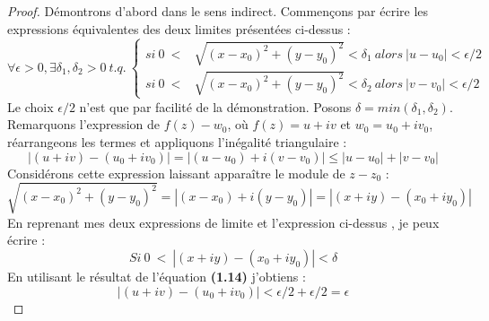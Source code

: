     
    
    \begin{proof}
    Démontrons d'abord dans le sens indirect. Commençons par écrire les expressions équivalentes des
    deux limites présentées ci-dessus :
    \begin{equation}
    \forall \epsilon > 0, \exists \delta_1, \delta_2 > 0\ t.q.\ 
    \left\{\begin{array}{cc}
     si\ 0\ <& \sqrt{(x-x_0)^2+(y-y_0)^2}<\delta_1\ alors\ |u-u_0|<\epsilon/2 \\
     si\ 0\ <& \sqrt{(x-x_0)^2+(y-y_0)^2}<\delta_2\ alors\ |v-v_0|<\epsilon/2 
    \end{array}\right.
    \end{equation}
    Le choix $\epsilon/2$ n'est que par facilité de la démonstration. Posons $\delta = min(\delta_1
    ,\delta_2)$. Remarquons l'expression de $f(z) - w_0$, où $f(z) = u+iv$ et $w_0 = u_0+iv_0$,
    réarrangeons les termes et appliquons l'inégalité triangulaire :
    \begin{equation}
    |(u+iv) - (u_0+iv_0)| = |(u-u_0)+i(v-v_0)| \leq |u-u_0| + |v-v_0|
    \end{equation}
    Considérons cette expression laissant apparaître le module de $z-z_0$ :
    \begin{equation}
    \sqrt{(x-x_0)^2+(y-y_0)^2} = |(x-x_0)+i(y-y_0)| = |(x+iy)-(x_0+iy_0)|
    \end{equation}
    En reprenant mes deux expressions de limite et l'expression ci-dessus , je peux écrire :
    \begin{equation}
    Si\ 0\ <\ |(x+iy) - (x_0+iy_0)| < \delta
    \end{equation}
    En utilisant le résultat de l'équation \textbf{(1.14)} j'obtiens :
    \begin{equation}
    |(u+iv) - (u_0+iv_0)| < \epsilon/2 + \epsilon/2 = \epsilon
    \end{equation}
    

\end{proof}
